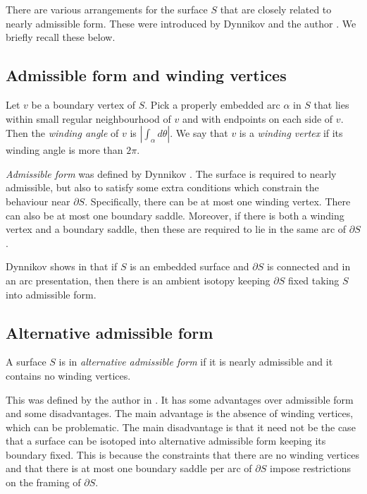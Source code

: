 \documentclass[oneside]{amsart}
\numberwithin{equation}{section}
\theoremstyle{plain}
\theoremstyle{definition}
\begin{document}
There are various arrangements for the surface $S$ that are closely related to nearly admissible form.
These were introduced by Dynnikov \cite{Dynnikov} and the author \cite{Lackenby:PolyUnknot}. We briefly recall these below.

\subsection{Admissible form and winding vertices}

Let $v$ be a boundary vertex of $S$. Pick a properly embedded arc $\alpha$ in $S$ that lies within small regular neighbourhood
of $v$ and with endpoints on each side of $v$. Then the \emph{winding angle} of $v$ is $|\int_\alpha d \theta |$. We say
that $v$ is a \emph{winding vertex} if its winding angle is more than $2 \pi$.

\emph{Admissible form} was defined by Dynnikov \cite{Dynnikov}. The surface is required to nearly admissible,
but also to satisfy some extra conditions which constrain the behaviour near $\partial S$. 
Specifically, there can be at most one winding vertex. There can also be at most one
boundary saddle. Moreover, if there is both a winding vertex and a boundary saddle, then these are required
to lie in the same arc of $\partial S$. 

Dynnikov shows in \cite{Dynnikov} that if $S$ is an embedded surface and $\partial S$ is connected and
in an arc presentation, then there is an ambient isotopy keeping $\partial S$ fixed taking $S$ into admissible form.

\subsection{Alternative admissible form}

A surface $S$ is in \emph{alternative admissible form} if it is nearly admissible and it contains no winding
vertices.

This was defined by the author in \cite{Lackenby:PolyUnknot}. It has some advantages over admissible form
and some disadvantages. The main advantage is the absence of winding vertices,
which can be problematic. The main disadvantage is that it need not be the case that
a surface can be isotoped into alternative admissible form keeping its boundary fixed.
This is because the constraints that there are no winding vertices and that there is at most one boundary
saddle per arc of $\partial S$ impose restrictions on the framing of $\partial S$.
\end{document}
